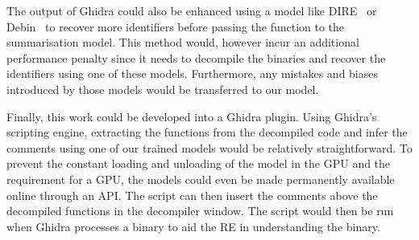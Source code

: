 The output of Ghidra could also be enhanced using a model like DIRE~\cite{Dire} or Debin~\cite{Debin} to recover more identifiers before passing the function to the summarisation model. This method would, however incur an additional performance penalty since it needs to decompile the binaries and recover the identifiers using one of these models. Furthermore, any mistakes and biases introduced by those models would be transferred to our model.




Finally, this work could be developed into a Ghidra plugin. Using Ghidra's scripting engine, extracting the functions from the decompiled code and infer the comments using one of our trained models would be relatively straightforward. To prevent the constant loading and unloading of the model in the GPU and the requirement for a GPU, the models could even be made permanently available online through an API. The script can then insert the comments above the decompiled functions in the decompiler window. The script would then be run when Ghidra processes a binary to aid the RE in understanding the binary.



